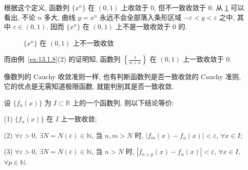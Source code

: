 根据这个定义, 函数列 $\{x^{n}\}$ 在 $(0,1)$ 上收敛于 $0$, 但不一致收敛于 $0$. 从 \cref{fig:13.1.2} 可以看出, 不论 $n$ 多大, 曲线 $y=x^{n}$ 永远不会全部落入条形区域 $-\varepsilon<y<\varepsilon$ 之中, 其中 $\varepsilon\in(0,1)$. 因而 $\{x^{n}\}$ 在 $(0,1)$ 上不是一致收敛于 $0$ 的.

\begin{figure}[htbp]
  \centering
  \caption{$\{x^{n}\}$ 在 $(0,1)$ 上不一致收敛}\label{fig:13.1.2}
\end{figure}

而由例~\ref{ex:13.1.8}(2) 的证明知, 函数列 $\left\{\frac{1}{n+x}\right\}$ 在 $(0,1)$ 上一致收敛于 $0$.

像数列的 Cauchy 收敛准则一样, 也有判断函数列是否一致收敛的 Cauchy 准则, 它的优点是无需知道极限函数, 就能判别其是否一致收敛.

\begin{theorem}\label{thm:13.1.1}
设 $\{f_{n}(x)\}$ 为 $I\subset\mathbb{R}$ 上的一个函数列, 则以下结论等价:

(1) $\{f_{n}(x)\}$ 在 $I$ 上一致收敛;

(2) $\forall\varepsilon>0$, $\exists N=N(\varepsilon)\in\mathbb{N}$, 当 $n,m>N$ 时, $|f_{m}(x)-f_{n}(x)|<\varepsilon$, $\forall x\in I$;

(3) $\forall\varepsilon>0$, $\exists N=N(\varepsilon)\in\mathbb{N}$, 当 $n>N$ 时, $|f_{n+p}(x)-f_{n}(x)|<\varepsilon$, $\forall x\in I$, $\forall p\in\mathbb{N}$.
\end{theorem}

